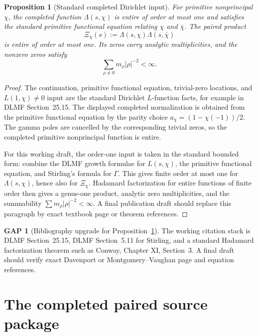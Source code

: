 \documentclass[11pt,a4paper]{amsart}
\theoremstyle{plain}
\newtheorem{proposition}[theorem]{Proposition}
\theoremstyle{definition}
\newtheorem{gap}[theorem]{GAP}
\begin{document}
\begin{proposition}[Standard completed Dirichlet input]
\label{prop:standard-input}
For primitive nonprincipal \(\chi\), the completed function
\(\Lambda(s,\chi)\) is entire of order at most one and satisfies the standard
primitive functional equation relating \(\chi\) and \(\overline\chi\).  The
paired product
\[
  \Xi_\chi(s):=\Lambda(s,\chi)\Lambda(s,\overline\chi)
\]
is entire of order at most one.  Its zeros carry analytic multiplicities, and
the nonzero zeros satisfy
\[
  \sum_{\rho\neq 0}m_\rho |\rho|^{-2}<\infty.
\]
\end{proposition}

\begin{proof}
The continuation, primitive functional equation, trivial-zero locations, and
\(L(1,\chi)\neq 0\) input are the standard Dirichlet \(L\)-function facts,
for example in DLMF Section~25.15.  The displayed completed normalization is
obtained from the primitive functional equation by the parity choice
\(a_\chi=(1-\chi(-1))/2\).  The gamma poles are cancelled by the corresponding
trivial zeros, so the completed primitive nonprincipal function is entire.

For this working draft, the order-one input is taken in the standard bounded
form: combine the DLMF growth formulae for \(L(s,\chi)\), the primitive
functional equation, and Stirling's formula for \(\Gamma\).  This gives finite
order at most one for \(\Lambda(s,\chi)\), hence also for
\(\Xi_\chi\).  Hadamard factorization for entire functions of finite order then
gives a genus-one product, analytic zero multiplicities, and the summability
\(\sum m_\rho|\rho|^{-2}<\infty\).  A final publication draft should replace
this paragraph by exact textbook page or theorem references.
\end{proof}

\begin{gap}[Bibliography upgrade for Proposition~\ref{prop:standard-input}]
\label{gap:bibliography}
The working citation stack is DLMF Section~25.15, DLMF Section~5.11 for
Stirling, and a standard Hadamard factorization theorem such as Conway,
Chapter XI, Section~3.  A final draft should verify exact Davenport or
Montgomery--Vaughan page and equation references.
\end{gap}

\section{The completed paired source package}
\label{sec:source}
\end{document}
